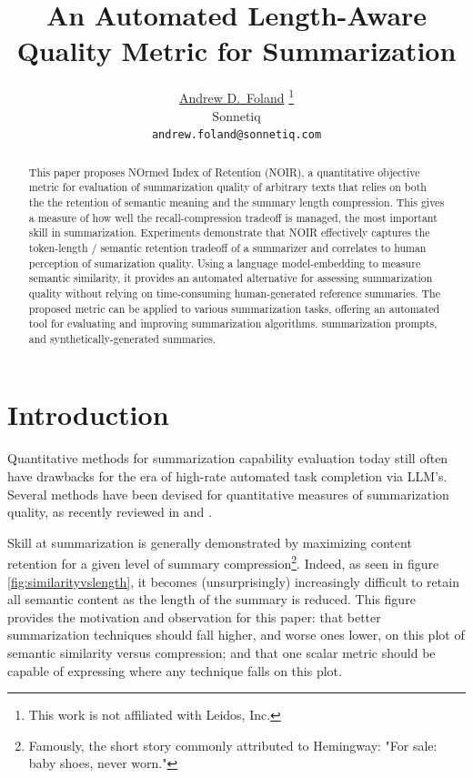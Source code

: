 \documentclass{article}
\title{An Automated Length-Aware Quality Metric for Summarization}
\author{ 
	\href{}{
		\hspace{1mm}
		Andrew D.~Foland}
	\thanks{This work is not affiliated with Leidos, Inc.
	}\\ 
    Sonnetiq\\
	\texttt{andrew.foland@sonnetiq.com} \\
}
\date{}
\begin{document}
\maketitle

\begin{abstract}
This paper proposes NOrmed Index of Retention (NOIR), a quantitative objective metric for evaluation of summarization quality of arbitrary texts that relies on both the the retention of semantic meaning and the summary length compression. 
This gives a measure of how well the recall-compression tradeoff is managed,
the most important skill in summarization.
Experiments demonstrate that NOIR effectively captures the token-length / semantic retention tradeoff of a summarizer and correlates to human perception of sumarization quality. 
Using a language model-embedding to measure semantic similarity, it provides an automated alternative for assessing summarization quality without relying on time-consuming human-generated reference summaries. 
The proposed metric can be applied to various summarization tasks, offering an automated tool for evaluating and improving summarization algorithms. summarization prompts, and synthetically-generated summaries.
\end{abstract}




\section{Introduction}
Quantitative methods for summarization capability evaluation today still often have drawbacks for the era of high-rate automated task completion via LLM's.
Several methods have been devised for quantitative measures of summarization quality, as recently reviewed in \citep{2023arXiv230504853R} and \citep{fabbri_summeval_2021}. 

Skill at summarization is generally demonstrated by maximizing content retention for a given level of summary compression\footnote{Famously, the short story commonly attributed to Hemingway: "For sale: baby shoes, never worn."}.  
Indeed, as seen in figure \ref{fig:similarityvslength}, it becomes (unsurprisingly) increasingly difficult to retain all semantic content as the length of the summary is reduced.
This figure provides the motivation and observation for this paper: that better summarization techniques should fall higher, and worse ones lower, on this plot of semantic similarity versus compression; and that one scalar metric should be capable of expressing where any technique falls on this plot.
\end{document}
